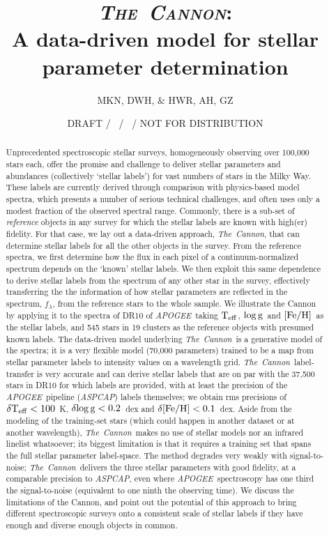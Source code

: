 \documentclass[12pt, preprint]{aastex}
\newcommand{\teff}{\mbox{$\rm T_{eff}$}}
\newcommand{\feh}{\mbox{$\rm [Fe/H]$}}
\newcommand{\logg}{\mbox{$\rm \log g$}}
\newcommand{\tc}{\textsl{The~Cannon}}
\newcommand{\apogee}{\textsl{APOGEE}}
\newcommand{\aspcap}{\textsl{ASPCAP}}
\begin{document}
\title{\textsc{\tc:}\\ A data-driven model for stellar parameter determination}
\author{
  MKN,
  DWH,
  \&
  HWR,
  AH, GZ} 
\date{DRAFT / \gitdate\ / \githash\ / NOT FOR DISTRIBUTION}



\begin{abstract}%

Unprecedented spectroscopic stellar surveys, homogeneously
observing over 100,000 stars each, offer the
promise and challenge to deliver stellar parameters and
abundances (collectively `stellar labels') for vast numbers of
stars in the Milky Way. These labels are currently derived
through comparison with physics-based model spectra,
which presents a number of serious technical
challenges, and often uses only a modest fraction of the
observed spectral range.  Commonly, there is a sub-set of
{\it reference} objects in any survey for which the stellar labels
are known with high(er) fidelity. For that case,
we lay out a data-driven approach, \tc,
that can determine stellar labels for all the other objects
in the survey. From the reference spectra, we first determine how
the flux in each pixel of a continuum-normalized spectrum
depends on the `known' stellar labels. We then exploit this
same dependence to derive stellar labels from the spectrum
of any other star in the survey, effectively transferring the
the information of how stellar parameters are reflected in
the spectrum, $f_\lambda$, from the reference stars to the whole sample. We illustrate the Cannon by applying it to the spectra of DR10 of \apogee\ taking \teff, \logg\ and \feh\ as the stellar labels, and 545 stars in 19 clusters
as the reference objects with presumed known labels.
The data-driven model underlying \tc\ is a generative model of the
spectra; it is a very flexible model (70,000 parameters) trained to be
a map from stellar parameter labels to intensity values on a wavelength
grid. \tc\ label-transfer is very accurate and can derive stellar labels that are on par with the 
37,500 stars in DR10 for which labels are provided, with at least the precision of the \apogee\ pipeline (\aspcap) 
labels themselves; we obtain rms precisions of $\delta\teff< 100$~K,
$\delta\logg< 0.2$~dex and $\delta\feh< 0.1$~dex. Aside from the modeling of the training-set stars (which could happen
in another dataset or at another wavelength), \tc\ makes no use of
stellar models nor an infrared linelist whatsoever; its biggest limitation is that it requires a
training set that spans the full stellar parameter label-space.
The method degrades very weakly with signal-to-noise; \tc\ delivers
the three stellar parameters with good fidelity, at a comparable precision to \aspcap, even where
\apogee\ spectroscopy has one third the
signal-to-noise (equivalent to one ninth the observing time). We discuss the limitations of the Cannon, and point
out the potential of this approach to bring different spectroscopic
surveys onto a consistent scale of stellar labels if they have
enough and diverse enough objects in common. 


\end{abstract}
\end{document}
